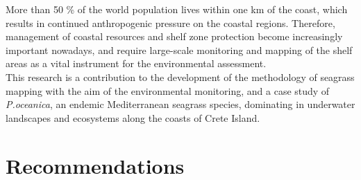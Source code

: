 \documentclass[11pt]{article}
\begin{document}
More than 50 \% of the world population lives within one km of the coast, which results in continued anthropogenic pressure on the coastal regions. Therefore, management of coastal resources and shelf zone protection become increasingly important nowadays, and require large-scale monitoring and mapping of the shelf areas as a vital instrument for the environmental assessment.\vspace{1ex}\\
This research is a contribution to the development of the methodology of seagrass mapping with the aim of the environmental monitoring, and a case study of \textit{P.oceanica}, an endemic Mediterranean seagrass species, dominating in underwater landscapes and ecosystems along the coasts of Crete Island.

\section*{Recommendations}\label{sec:7}
\singlespacing
\end{document}
